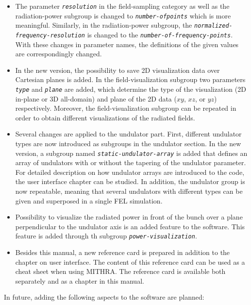 \begin{itemize}
	\item The parameter {\tt \em \small resolution} in the field-sampling category as well as the radiation-power subgroup is changed to {\tt \em \small number-of\-points} which is more meaningful. Similarly, in the radiation-power subgroup, the {\tt \em \small normalized-frequency-resolution} is changed to the {\tt \em \small number-of-frequency-points}. With these changes in parameter names, the definitions of the given values are correspondingly changed.
	\item In the new version, the possibility to save 2D visualization data over Cartesian planes is added. In the field-visualization subgroup two parameters {\tt \em \small type} and {\tt \em \small plane} are added, which determine the type of the visualization (2D in-plane or 3D all-domain) and plane of the 2D data ($xy$, $xz$, or $yz$) respectively. Moreover, the field-visualization subgroup can be repeated in order to obtain different visualizations of the radiated fields.
	\item Several changes are applied to the undulator part. First, different undulator types are now introduced as subgroups in the undulator section. In the new version, a subgroup named {\em \tt \small static-undulator-array} is added that defines an array of undulators with or without the tapering of the undulator parameter. For detailed description on how undulator arrays are introduced to the code, the user interface chapter can be studied. In addition, the undulator group is now repeatable, meaning that several undulators with different types can be given and superposed in a single FEL simulation.
	\item Possibility to visualize the radiated power in front of the bunch over a plane perpendicular to the undulator axis is an added feature to the software. This feature is added through th subgroup {\tt \em \small power-visualization}.
	\item Besides this manual, a new reference card is prepared in addition to the chapter on user interface. The content of this reference card can be used as a cheat sheet when using MITHRA. The reference card is available both separately and as a chapter in this manual. 
\end{itemize}
%
In future, adding the following aspects to the software are planned:
%
